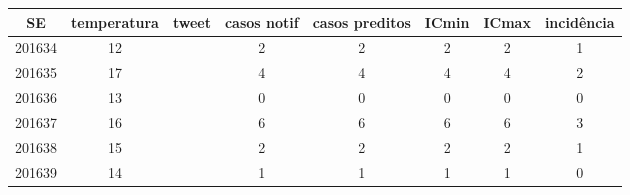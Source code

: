 \begin{tabular}{c|ccccccc}
  \hline
SE & temperatura & tweet & casos notif & casos preditos & ICmin & ICmax & incidência \\ 
  \hline
201634 & 12 &  & 2 & 2 & 2 & 2 & 1 \\ 
  201635 & 17 &  & 4 & 4 & 4 & 4 & 2 \\ 
  201636 & 13 &  & 0 & 0 & 0 & 0 & 0 \\ 
  201637 & 16 &  & 6 & 6 & 6 & 6 & 3 \\ 
  201638 & 15 &  & 2 & 2 & 2 & 2 & 1 \\ 
  201639 & 14 &  & 1 & 1 & 1 & 1 & 0 \\ 
   \hline
\end{tabular}
